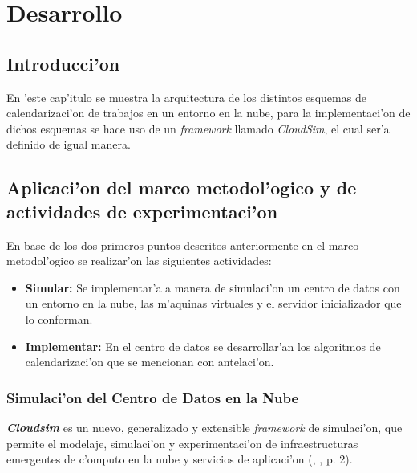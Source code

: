 \chapter{Desarrollo}
\section*{Introducci'on}

En 'este cap'itulo se muestra la arquitectura de los distintos esquemas de calendarizaci'on de trabajos en un entorno en la nube, para la implementaci'on de dichos esquemas se hace uso de un \textit{framework} llamado \textit{CloudSim}, el cual ser'a definido de igual manera.




\newpage
{}
\section{Aplicaci'on del marco metodol'ogico y de actividades de experimentaci'on}

En base de los dos primeros puntos descritos anteriormente en el marco metodol'ogico se realizar'on las siguientes actividades:

\begin{itemize}
	\item \textbf{Simular:} Se implementar'a a manera de simulaci'on un centro de datos con un entorno en la nube, las m'aquinas virtuales y el servidor inicializador que lo conforman.
	\item \textbf{Implementar:} En el centro de datos se desarrollar'an los algoritmos de calendarizaci'on que se mencionan con antelaci'on.
\end{itemize}

\subsection{Simulaci'on del Centro de Datos en la Nube}

 \textit{\textbf{Cloudsim}} es un nuevo, generalizado y extensible \textit{framework} de simulaci'on, que permite el modelaje, simulaci'on y experimentaci'on de infraestructuras emergentes de c'omputo en la nube y servicios de aplicaci'on (\citeauthor{calheiros2011cloudsim}, \citeyear{calheiros2011cloudsim}, p. 2).


